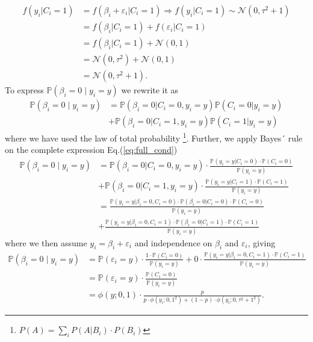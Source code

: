 \begin{align*}
    f(y_i|C_i=1) &= f(\beta_i + \varepsilon_i| C_i = 1)  \Rightarrow  \boxed{f(y_i|C_i=1) \sim \mathcal{N}(0, \tau^2 + 1)} \\[5pt]
    &=  f(\beta_i |C_i=1) + f(\varepsilon_i | C_i = 1) \\[5pt]
    &= f(\beta_i |C_i=1) + \mathcal{N}(0, 1) \\[5pt]
    &= \mathcal{N}(0, \tau^2) + \mathcal{N}(0, 1) \\[5pt]
    &= \mathcal{N}(0, \tau^2 + 1).
\end{align*}
To express $\mathbb{P}\left(\beta_i=0 \mid y_i=y\right)$ we rewrite it as
\begin{align}
     \mathbb{P}\left(\beta_i=0 \mid y_i=y\right) &= \mathbb{P}(\beta_i = 0 | C_i=0, y_i=y) \mathbb{P}(C_i =0| y_i=y) \\
     &+ \mathbb{P}(\beta_i =0| C_i =1, y_i=y) \mathbb{P}(C_i =1| y_i=y) \label{eq:full_cond}
\end{align}
where we have used the law of total probability \footnote{$P(A) = \sum_{i} P(A | B_i) \cdot P(B_i)$}. Further, we apply Bayes´ rule on the complete expression Eq.(\ref{eq:full_cond})
\begin{align*}
\mathbb{P}\left(\beta_i=0 \mid y_i=y\right) &= \mathbb{P}(\beta_i = 0 | C_i=0, y_i=y) \cdot \frac{\mathbb{P}(y_i=y|C_i=0) \cdot \mathbb{P}(C_i=0)}{\mathbb{P}(y_i=y)} \\ 
&+ \mathbb{P}(\beta_i =0| C_i =1, y_i=y) \cdot \frac{\mathbb{P}(y_i=y|C_i=1) \cdot \mathbb{P}(C_i=1)}{\mathbb{P}(y_i=y)} \\[8pt]
&= \frac{\mathbb{P}(y_i=y|\beta_i=0, C_i=0) \cdot \mathbb{P}(\beta_i=0|C_i=0) \cdot \mathbb{P}(C_i=0)}{\mathbb{P}(y_i=y)} \\
&+ \frac{\mathbb{P}(y_i=y|\beta_i=0, C_i=1) \cdot \mathbb{P}(\beta_i=0|C_i=1) \cdot \mathbb{P}(C_i=1)}{\mathbb{P}(y_i=y)} 
\end{align*}
where we then assume $y_i = \beta_i + \varepsilon_i$ and independence on $\beta_i$ and $\varepsilon_i$, giving
\begin{align*}
    \mathbb{P}\left(\beta_i=0 \mid y_i=y\right) &= \mathbb{P}(\varepsilon_i = y) \cdot \frac{1 \cdot \mathbb{P}(C_i=0)}{\mathbb{P}(y_i = y)} + 0 \cdot \frac{\mathbb{P}(y_i=y|\beta_i=0, C_i=1) \cdot \mathbb{P}(C_i =1)}{\mathbb{P}(y_i=y)} \\[8pt]
    &= \mathbb{P}(\varepsilon_i = y) \cdot \frac{\mathbb{P}(C_i=0)}{\mathbb{P}(y_i = y)} \\[5pt]
    &= \phi(y; 0,1) \cdot \frac{p}{p \cdot \phi\left(y_i ; 0,1^2\right)+(1-p) \cdot \phi\left(y_i ; 0, \tau^2+1^2\right)}.
\end{align*} 
